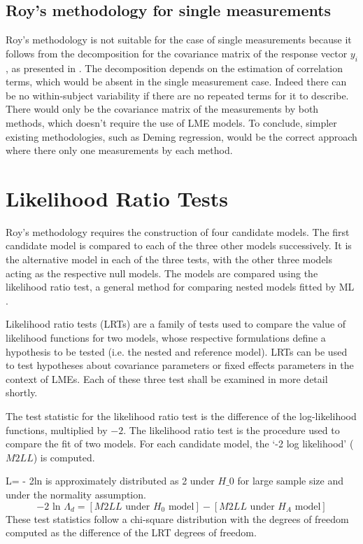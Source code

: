 \documentclass[12pt, a4paper]{report}
\theoremstyle{plain}
\theoremstyle{definition}
\theoremstyle{remark}
\begin{document}
	
	\subsection{Roy's methodology for single measurements}
	
	Roy's methodology is not suitable for the case of single measurements because it follows from the decomposition for the covariance matrix of the response vector $y_{i}$, as presented in \citet{hamlett}. The decomposition depends on the estimation of correlation terms, which would be absent in the single measurement case. Indeed there can be no within-subject variability if there are no repeated terms for it to describe. There would only be the covariance matrix of the measurements by both methods, which doesn't require the use of LME models. To conclude, simpler existing methodologies, such as Deming regression, would be the correct approach where there only one measurements by each method.
	
	


	\section{Likelihood Ratio Tests}
		Roy's methodology requires the construction of four candidate models. The first candidate model is compared to each of the three other models successively. It is the alternative model in each of the three tests, with the other three models acting as the respective null models. The models are compared using the likelihood ratio test, a general method for comparing nested models fitted by ML \citep{Lehmann2006}.
	
	Likelihood ratio tests (LRTs) are a family of tests used to compare the value of likelihood functions for two models, whose respective formulations define a hypothesis to be tested (i.e. the nested and reference model). LRTs can be used to test hypotheses about covariance parameters or fixed effects parameters in the context of LMEs.  Each of these three test shall be examined in more detail shortly.
	
	The test statistic for the likelihood ratio test is the difference of the log-likelihood functions, multiplied by $-2$.	The likelihood ratio test is the procedure used to compare the fit of two models. For each candidate model, the `-2 log likelihood' ($M2LL$) is computed. 
	
	L= - 2ln is approximately distributed as 2 under $H\_0$ for large sample size and under the normality assumption.
	\begin{equation}
	-2\mbox{ ln }\Lambda_{d} =  [ M2LL \mbox{ under }H_{0} \mbox{ model}] - [ M2LL \mbox{ under }H_{A} \mbox{ model}]
	\end{equation}
	These test statistics follow a chi-square distribution with the degrees of freedom computed as the difference of the LRT degrees of freedom.
	
\end{document}
